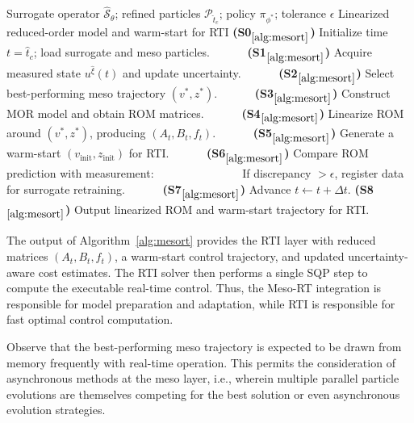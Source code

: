 \documentclass{article}
\newcommand{\1}{\mathds{1}}          %
\def\spc{~~~}
\theoremstyle{definition}
\begin{document}
\begin{sloppypar}
\begin{algorithm}[H]
\caption{Meso-Real-Time Integration for Hierarchical Control}
\label{alg:mesort}
\begin{algorithmic}
    \Require Surrogate operator $\hat{\mathcal{S}}_{\theta}$; refined particles $\mathcal{P}_{\hat{t}_c}$;
             policy $\pi_{\phi^{*}}$; tolerance $\epsilon$
    \Ensure Linearized reduced-order model and warm-start for RTI
    \Statex \textbf{(S0$_{\ref{alg:mesort}}$)} Initialize time $t=\hat{t}_c$; load surrogate and meso particles.
        \Statex \spc\spc \textbf{(S1$_{\ref{alg:mesort}}$)} Acquire measured state $u^{\hat{\xi}}(t)$ and update uncertainty.
        \Statex \spc\spc \textbf{(S2$_{\ref{alg:mesort}}$)} Select best-performing meso trajectory $(v^*,z^*)$.
        \Statex \spc\spc \textbf{(S3$_{\ref{alg:mesort}}$)} Construct MOR model and obtain ROM matrices.
        \Statex \spc\spc \textbf{(S4$_{\ref{alg:mesort}}$)} Linearize ROM around $(v^*,z^*)$, producing $(A_t,B_t,f_t)$.
        \Statex \spc\spc \textbf{(S5$_{\ref{alg:mesort}}$)} Generate a warm-start $(v_{\mathrm{init}},z_{\mathrm{init}})$ for RTI.
        \Statex \spc\spc \textbf{(S6$_{\ref{alg:mesort}}$)} Compare ROM prediction with measurement: 
        \Statex \spc\spc \spc\spc \spc If discrepancy $>\epsilon$, register data for surrogate retraining.
        \Statex \spc\spc \textbf{(S7$_{\ref{alg:mesort}}$)} Advance $t \leftarrow t+\Delta t$.
    \EndWhile
    \Statex \textbf{(S8$_{\ref{alg:mesort}}$)} Output linearized ROM and warm-start trajectory for RTI.
\end{algorithmic}
\end{algorithm}    
    
    
    
The output of Algorithm~\ref{alg:mesort} provides the RTI layer with reduced matrices $(A_t,B_t,f_t)$, a warm-start control trajectory, and updated uncertainty-aware cost estimates. The RTI solver then performs a single SQP step to compute the executable real-time control. Thus, the Meso-RT integration is responsible for model preparation and adaptation, while RTI is responsible for fast optimal control computation.

Observe that the best-performing meso trajectory is expected to be drawn from memory frequently with real-time operation. This permits the consideration of asynchronous methods at the meso layer, i.e., wherein multiple parallel particle evolutions are themselves competing for the best solution or even asynchronous evolution strategies. 



\end{sloppypar}
\end{document}
